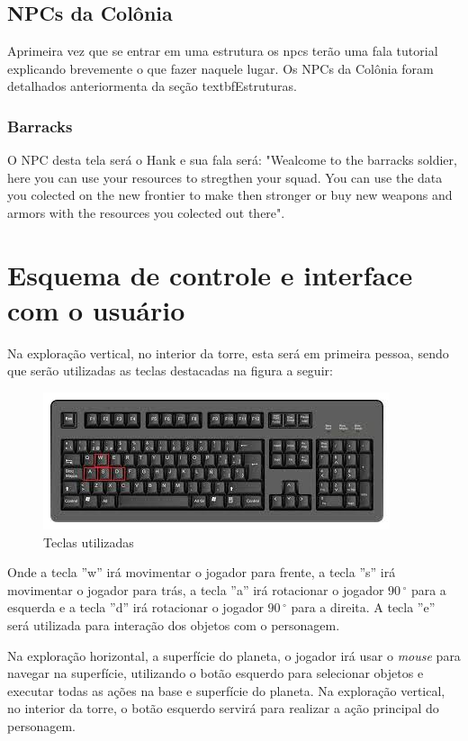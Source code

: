 \documentclass[11pt]{article} %
\begin{document}
\subsection{NPCs da Colônia}
Aprimeira vez que se entrar em uma estrutura os npcs terão uma fala tutorial explicando brevemente o que fazer naquele lugar. Os NPCs da Colônia foram detalhados anteriormenta da seção textbf{Estruturas}.

\subsubsection{Barracks}

O NPC desta tela será o Hank e sua fala será: "Wealcome to the barracks soldier, here you can use your resources to stregthen your squad. You can use the data you colected on the new frontier to make then stronger or buy new weapons and armors with the resources you colected out there".

\section{Esquema de controle e interface com o usuário}

Na exploração vertical, no interior da torre, esta será em primeira pessoa, sendo que serão utilizadas as teclas destacadas na figura a seguir:\\

\begin{figure}[!htp]
\centering
\includegraphics[scale=0.75]{res/keyboard.jpg}
\caption{Teclas utilizadas}
\label{Teclado}
\end{figure}

Onde a tecla ''w'' irá movimentar o jogador para frente, a tecla ''s'' irá movimentar o jogador para trás, a tecla ''a'' irá rotacionar o jogador $90\,^{\circ}$ para a esquerda e a tecla ''d'' irá rotacionar o jogador $90\,^{\circ}$ para a direita. A tecla ''e'' será utilizada para interação dos objetos com o personagem.

Na exploração horizontal, a superfície do planeta, o jogador irá usar o \textit{mouse} para navegar na superfície, utilizando o botão esquerdo para selecionar objetos e executar todas as ações na base e superfície do planeta. Na exploração vertical, no interior da torre, o botão esquerdo servirá para realizar a ação principal do personagem.
\end{document}
